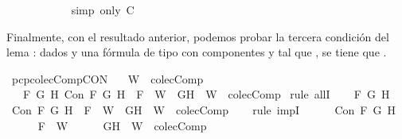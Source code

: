 \begin{isabellebody}
\ \ \ \ \ \ \ \ \ \ \isamarkupfalse%
\ {\isacharparenleft}simp\ only{\isacharcolon}\ C{}{\isacharparenright}\isanewline
\ \ \ \ \ \ \isamarkupfalse%
\isanewline
\ \ \ \ \isamarkupfalse%
\isanewline
\ \ \isamarkupfalse%
\isanewline
{}\isamarkupfalse%
%
\endisatagproof
{\isafoldproof}%
%
\isadelimproof
%
\endisadelimproof
%
\begin{isamarkuptext}%
Finalmente, con el resultado anterior, podemos probar la tercera condición del lema : 
  dados  y  una fórmula de tipo \isa{{\isasymalpha}} con componentes  y  tal que , se tiene 
  que .%
\end{isamarkuptext}\isamarkuptrue%
\isamarkupfalse%
\ pcp{\isacharunderscore}colecComp{\isacharunderscore}CON{\isacharcolon}\isanewline
\ \ \ {\isachardoublequoteopen}W\ {\isasymin}\ colecComp{\isachardoublequoteclose}\isanewline
\ \ \ {\isachardoublequoteopen}{\isasymforall}F\ G\ H{\isachardot}\ Con\ F\ G\ H\ {\isasymlongrightarrow}\ F\ {\isasymin}\ W\ {\isasymlongrightarrow}\ {\isacharbraceleft}G{\isacharcomma}H{\isacharbraceright}\ {\isasymunion}\ W\ {\isasymin}\ colecComp{\isachardoublequoteclose}\isanewline
%
\isadelimproof
%
\endisadelimproof
%
\isatagproof
{}\isamarkupfalse%
\ {\isacharparenleft}rule\ allI{\isacharparenright}{\isacharplus}\isanewline
\ \ \isamarkupfalse%
\ F\ G\ H\isanewline
\ \ \isamarkupfalse%
\ {\isachardoublequoteopen}Con\ F\ G\ H\ {\isasymlongrightarrow}\ F\ {\isasymin}\ W\ {\isasymlongrightarrow}\ {\isacharbraceleft}G{\isacharcomma}H{\isacharbraceright}\ {\isasymunion}\ W\ {\isasymin}\ colecComp{\isachardoublequoteclose}\isanewline
\ \ \isamarkupfalse%
\ {\isacharparenleft}rule\ impI{\isacharparenright}{\isacharplus}\isanewline
\ \ \ \ \isamarkupfalse%
\ {\isachardoublequoteopen}Con\ F\ G\ H{\isachardoublequoteclose}\isanewline
\ \ \ \ \isamarkupfalse%
\ {\isachardoublequoteopen}F\ {\isasymin}\ W{\isachardoublequoteclose}\isanewline
\ \ \ \ \isamarkupfalse%
\ {\isachardoublequoteopen}{\isacharbraceleft}G{\isacharcomma}H{\isacharbraceright}\ {\isasymunion}\ W\ {\isasymin}\ colecComp{\isachardoublequoteclose}\isanewline

\end{isabellebody}
